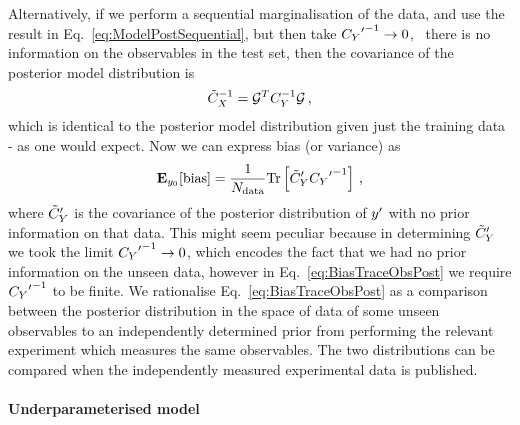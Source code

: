 Alternatively, if we perform a sequential marginalisation of the data, and use
the result in Eq.~\ref{eq:ModelPostSequential}, but then take
${{C_{Y}}^{\prime}}^{-1} \to 0$, \ie\ there is no information on the
observables in the test set, then the covariance of the posterior model
distribution is 
\begin{equation}
    \tilde{C}_X^{-1} = \mathcal{G}^T C_{Y}^{-1} \mathcal{G} \, ,
\end{equation}
which is identical to the posterior model distribution given just the training
data - as one would expect. Now we can express bias (or variance) as
\begin{equation}\label{eq:BiasTraceObsPost}
    \mathbf{E}_{y_0}[{\rm bias}] = \frac{1}{N_{\rm data}}
    {\rm Tr} \left[
        {{\tilde{C}_Y}^{\prime}}
        {{C_{Y}}^{\prime}}^{-1}
    \right] \, ,
\end{equation}
where ${{\tilde{C}_Y}^{\prime}}$ is the covariance of the posterior distribution of
${{y}^{\prime}}$ with no prior information on that data. This might seem
peculiar because in determining ${{\tilde{C}_Y}^{\prime}}$ we took the limit
${{C_{Y}}^{\prime}}^{-1} \to 0$, which encodes the fact that we had no prior
information on the unseen data, however in Eq.~\ref{eq:BiasTraceObsPost} we
require ${{C_{Y}}^{\prime}}^{-1}$ to be finite. We rationalise
Eq.~\ref{eq:BiasTraceObsPost} as a comparison between the posterior distribution
in the space of data of some unseen observables to an independently determined
prior from performing the relevant experiment which measures the same
observables. The two distributions can be compared when the independently
measured experimental data is published.


\paragraph{Underparameterised model}

